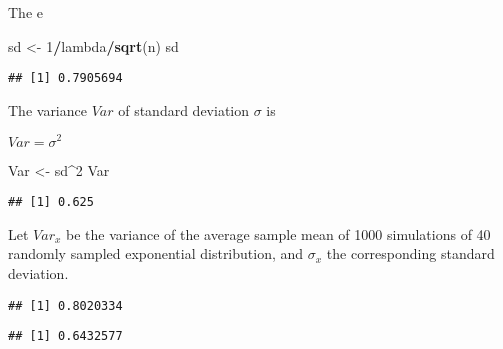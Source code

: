 \documentclass[
]{article}
\newenvironment{Shaded}{\begin{snugshade}}{\end{snugshade}}
\newcommand{\DecValTok}[1]{\textcolor[rgb]{0.00,0.00,0.81}{#1}}
\newcommand{\KeywordTok}[1]{\textcolor[rgb]{0.13,0.29,0.53}{\textbf{#1}}}
\newcommand{\NormalTok}[1]{#1}
\newcommand{\OperatorTok}[1]{\textcolor[rgb]{0.81,0.36,0.00}{\textbf{#1}}}
\newcommand{\StringTok}[1]{\textcolor[rgb]{0.31,0.60,0.02}{#1}}
\begin{document}
The e

\begin{Shaded}
\begin{Highlighting}[]
\NormalTok{sd <-}\StringTok{ }\DecValTok{1}\OperatorTok{/}\NormalTok{lambda}\OperatorTok{/}\KeywordTok{sqrt}\NormalTok{(n)}
\NormalTok{sd}
\end{Highlighting}
\end{Shaded}

\begin{verbatim}
## [1] 0.7905694
\end{verbatim}

The variance \(Var\) of standard deviation \(\sigma\) is

\(Var = \sigma^2\)

\begin{Shaded}
\begin{Highlighting}[]
\NormalTok{Var <-}\StringTok{ }\NormalTok{sd}\OperatorTok{^}\DecValTok{2}
\NormalTok{Var}
\end{Highlighting}
\end{Shaded}

\begin{verbatim}
## [1] 0.625
\end{verbatim}

Let \(Var_x\) be the variance of the average sample mean of 1000
simulations of 40 randomly sampled exponential distribution, and
\(\sigma_x\) the corresponding standard deviation.

\begin{Shaded}
\end{Shaded}

\begin{verbatim}
## [1] 0.8020334
\end{verbatim}

\begin{Shaded}
\end{Shaded}

\begin{verbatim}
## [1] 0.6432577
\end{verbatim}
\end{document}

